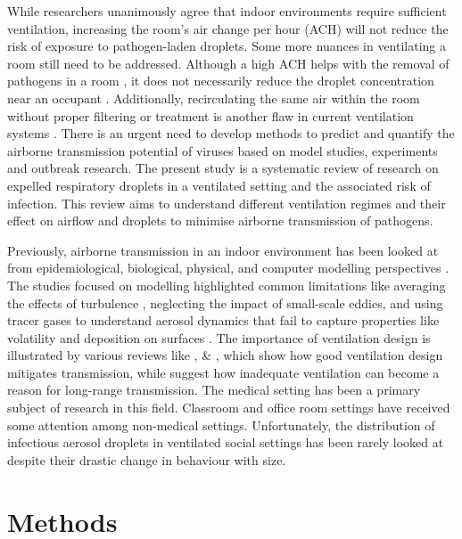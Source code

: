 \documentclass[a4paper,12pt]{elsarticle}
\begin{document}
While researchers unanimously agree that indoor environments require sufficient ventilation, increasing the room's air change per hour (ACH) will not reduce the risk of exposure to pathogen-laden droplets. Some more nuances in ventilating a room still need to be addressed. Although a high ACH helps with the removal of pathogens in a room \cite{guo2022visualization, ho2021modeling}, it does not necessarily reduce the droplet concentration near an occupant \cite{arpino2023cfd}. Additionally, recirculating the same air within the room without proper filtering or treatment is another flaw in current ventilation systems \cite{li2021probable}. There is an urgent need to develop methods to predict and quantify the airborne transmission potential of viruses based on model studies, experiments and outbreak research. The present study is a systematic review of research on expelled respiratory droplets in a ventilated setting and the associated risk of infection. This review aims to understand different ventilation regimes and their effect on airflow and droplets to minimise airborne transmission of pathogens.

Previously, airborne transmission in an indoor environment has been looked at from epidemiological, biological, physical, and computer modelling perspectives \cite{argyropoulos2023airborne}. The studies focused on modelling highlighted common limitations like averaging the effects of turbulence \cite{mirzaie2021covid,dbouk2020respiratory},  neglecting the impact of small-scale eddies, and using tracer gases to understand aerosol dynamics that fail to capture properties like volatility and deposition on surfaces \cite{rayegan2022review, zhao2022airborne}. The importance of ventilation design is illustrated by various reviews like \cite{luongo2016role}, \cite{hobeika2023assessing} \& \cite{thornton2022impact}, which show how good ventilation design mitigates transmission, while \citet{correia2020airborne} suggest how inadequate ventilation can become a reason for long-range transmission. The medical setting has been a primary subject of research in this field. Classroom and office room settings have received some attention among non-medical settings. Unfortunately, the distribution of infectious aerosol droplets in ventilated social settings has been rarely looked at despite their drastic change in behaviour with size.

\section{Methods}
\end{document}
